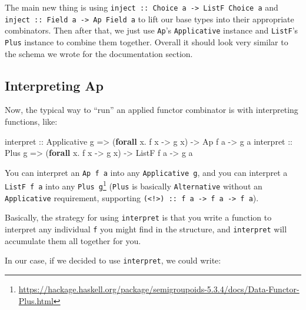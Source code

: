 \documentclass[]{article}
\newenvironment{Shaded}{}{}
\newcommand{\DataTypeTok}[1]{\textcolor[rgb]{0.56,0.13,0.00}{#1}}
\newcommand{\KeywordTok}[1]{\textcolor[rgb]{0.00,0.44,0.13}{\textbf{#1}}}
\newcommand{\NormalTok}[1]{#1}
\newcommand{\OperatorTok}[1]{\textcolor[rgb]{0.40,0.40,0.40}{#1}}
\newcommand{\OtherTok}[1]{\textcolor[rgb]{0.00,0.44,0.13}{#1}}
\renewcommand{\href}[2]{#2\footnote{\url{#1}}}
\begin{document}
The main new thing is using
\texttt{inject\ ::\ Choice\ a\ -\textgreater{}\ ListF\ Choice\ a} and
\texttt{inject\ ::\ Field\ a\ -\textgreater{}\ Ap\ Field\ a} to lift our base
types into their appropriate combinators. Then after that, we just use
\texttt{Ap}'s \texttt{Applicative} instance and \texttt{ListF}'s \texttt{Plus}
instance to combine them together. Overall it should look very similar to the
schema we wrote for the documentation section.

\hypertarget{interpreting-ap}{%
\subsection{Interpreting Ap}\label{interpreting-ap}}

Now, the typical way to ``run'' an applied functor combinator is with
interpreting functions, like:

\begin{Shaded}
\begin{Highlighting}[]
\OtherTok{interpret ::} \DataTypeTok{Applicative}\NormalTok{ g }\OtherTok{=>}\NormalTok{ (}\KeywordTok{forall}\NormalTok{ x}\OperatorTok{.}\NormalTok{ f x }\OtherTok{{-}>}\NormalTok{ g x) }\OtherTok{{-}>} \DataTypeTok{Ap}\NormalTok{    f a }\OtherTok{{-}>}\NormalTok{ g a}
\OtherTok{interpret ::} \DataTypeTok{Plus}\NormalTok{ g        }\OtherTok{=>}\NormalTok{ (}\KeywordTok{forall}\NormalTok{ x}\OperatorTok{.}\NormalTok{ f x }\OtherTok{{-}>}\NormalTok{ g x) }\OtherTok{{-}>} \DataTypeTok{ListF}\NormalTok{ f a }\OtherTok{{-}>}\NormalTok{ g a}
\end{Highlighting}
\end{Shaded}

You can interpret an \texttt{Ap\ f\ a} into any \texttt{Applicative\ g}, and you
can interpret a \texttt{ListF\ f\ a} into any
\href{https://hackage.haskell.org/package/semigroupoids-5.3.4/docs/Data-Functor-Plus.html}{\texttt{Plus\ g}}
(\texttt{Plus} is basically \texttt{Alternative} without an \texttt{Applicative}
requirement, supporting
\texttt{(\textless{}!\textgreater{})\ ::\ f\ a\ -\textgreater{}\ f\ a\ -\textgreater{}\ f\ a}).

Basically, the strategy for using \texttt{interpret} is that you write a
function to interpret any individual \texttt{f} you might find in the structure,
and \texttt{interpret} will accumulate them all together for you.

In our case, if we decided to use \texttt{interpret}, we could write:
\end{document}
